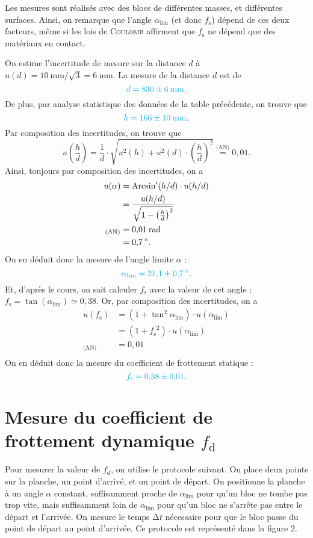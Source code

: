\documentclass[a4paper,twocolumn,10pt]{report}
\begin{document}
	Les mesures sont réalisés avec des blocs de différentes masses, et différentes surfaces.
	Ainsi, on remarque que l'angle $\alpha_{\lim}$\/ (et donc $f_\mathrm{s}$) dépend de ces deux facteurs, même si les lois de \textsc{Coulomb} affirment que $f_\mathrm{s}$\/ ne dépend que des matériaux en contact.

	On estime l'incertitude de mesure sur la distance $d$\/ à $u(d) = 10\:\mathrm{mm}/\!\sqrt{3} = 6\:\mathrm{mm}$. La mesure de la distance $d$\/ est de \[
		{\color{cyan} d = 830 \pm 6\: \mathrm{mm}}
	.\] De plus, par analyse statistique des données de la table précédente, on trouve que \[
		{\color{cyan} h = 166 \pm 10\: \mathrm{mm}}
	.\]
	Par composition des incertitudes, on trouve que
	\[
		u\!\left( \frac{h}{d} \right) = \frac{1}{d} \cdot \sqrt{u^2(h) + u^2(d) \cdot \left( \frac{h}{d} \right)^{\!\!2}} \mathrel{\overset{\text{(AN)}}=} 0{,}01
	.\] Ainsi, toujours par composition des incertitudes, on a
	\begin{align*}
		u(\alpha) &= \operatorname{Arcsin}'(h / d) \cdot u(h / d)\\
		&= \frac{u(h / d)}{\sqrt{1 - \left( \frac{h}{d} \right)^2}} \\
		{}_\text{(AN)}&= 0{,}01\: \mathrm{rad} \\
		&= 0{,}7\:^\circ. \\
	\end{align*}
	On en déduit donc la mesure de l'angle limite $\alpha$\/ : \[
		{\color{cyan} \alpha_{\lim} = 21{,}1 \pm 0{,}7\:^\circ}
	.\]
	Et, d'après le cours, on sait calculer $f_\mathrm{s}$\/ avec la valeur de cet angle : $f_\mathrm{s} = \tan(\alpha_{\lim}) \simeq 0{,}38$.
	Or, par composition des incertitudes, on a
	\begin{align*}
		u(f_\mathrm{s}) &= (1 + \tan^2 \alpha_{\lim}) \cdot u(\alpha_{\lim})\\
		&= (1 + {f_\mathrm{s}}^2) \cdot u(\alpha_{\lim})  \\
		_\text{(AN)} &= 0{,}01 \\
	\end{align*}
	On en déduit donc la mesure du coefficient de frottement statique : \[
		{\color{cyan}f_\mathrm{s} = 0{,}38 \pm 0{,}01}
	.\]

	\section{Mesure du coefficient de frottement dynamique $f_\mathrm{d}$}

	Pour mesurer la valeur de $f_\mathrm{d}$, on utilise le protocole suivant. On place deux points sur la planche, un point d'arrivé, et un point de départ. On positionne la planche à un angle $\alpha$\/ constant, suffisamment proche de $\alpha_{\lim}$\/ pour qu'un bloc ne tombe pas trop vite, mais suffisamment loin de $\alpha_{\lim}$\/ pour qu'un bloc ne s'arrête pas entre le départ et l'arrivée. On mesure le temps $\mathrm{\Delta}t$\/ nécessaire pour que le bloc passe du point de départ au point d'arrivée.
	Ce protocole est représenté dans la figure 2.
\end{document}
